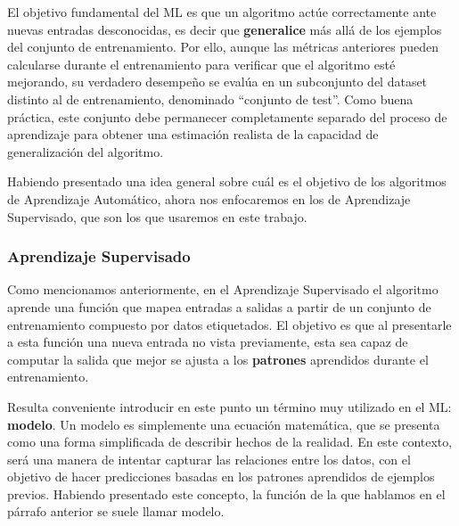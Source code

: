 \documentclass[../../main.tex]{subfiles}
\begin{document}
El objetivo fundamental del ML es que un algoritmo actúe correctamente ante nuevas
entradas desconocidas, es decir que \textbf{generalice} más allá de los ejemplos del
conjunto de entrenamiento. Por ello, aunque las métricas anteriores pueden calcularse
durante el entrenamiento para verificar que el algoritmo esté mejorando, su verdadero
desempeño se evalúa en un subconjunto del dataset distinto al de entrenamiento, denominado
``conjunto de test''. Como buena práctica, este conjunto debe permanecer completamente
separado del proceso de aprendizaje para obtener una estimación realista de la capacidad
de generalización del algoritmo.

\bigskip
Habiendo presentado una idea general sobre cuál es el objetivo de los algoritmos de
Aprendizaje Automático, ahora nos enfocaremos en los de Aprendizaje Supervisado, que son
los que usaremos en este trabajo.

\begin{comment}
En este contexto, un modelo será una forma de intentar capturar las relaciones entre los
datos, con el objetivo de hacer predicciones o tomar decisiones basadas en patrones
aprendidos de ejemplos previos.
\end{comment}

\subsubsection{Aprendizaje Supervisado}
Como mencionamos anteriormente, en el Aprendizaje Supervisado el algoritmo aprende una
función que mapea entradas a salidas a partir de un conjunto de entrenamiento compuesto
por datos etiquetados. El objetivo es que al presentarle a esta función una nueva entrada
no vista previamente, esta sea capaz de computar la salida que mejor se ajusta a los
\textbf{patrones} aprendidos durante el entrenamiento.

Resulta conveniente introducir en este punto un término muy utilizado en el ML:
\textbf{modelo}. Un modelo es simplemente una ecuación matemática, que se presenta como
una forma simplificada de describir hechos de la realidad. En este contexto, será una
manera de intentar capturar las relaciones entre los datos, con el objetivo de hacer
predicciones basadas en los patrones aprendidos de ejemplos previos. Habiendo presentado
este concepto, la función de la que hablamos en el párrafo anterior se suele llamar
modelo.
\end{document}

